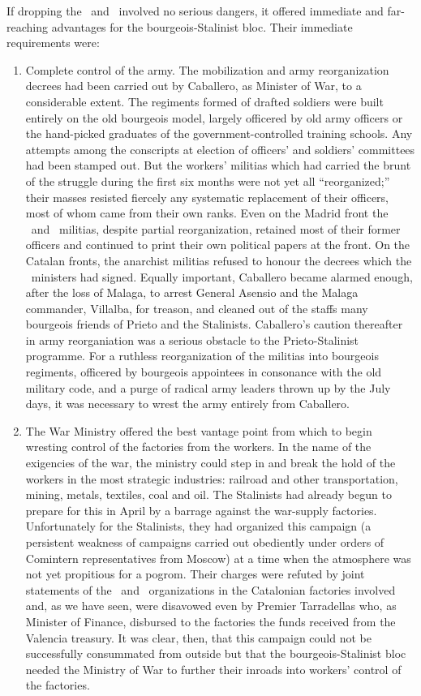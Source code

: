 If dropping the \UGT\ and \CNT\ involved no serious dangers, it offered immediate and far-reaching advantages for the bourgeois-Stalinist bloc. Their immediate requirements were:

\begin{enumerate}
  \item Complete control of the army. The mobilization and army reorganization decrees had been carried out by Caballero, as Minister of War, to a considerable extent. The regiments formed of drafted soldiers were built entirely on the old bourgeois model, largely officered by old army officers or the hand-picked graduates of the government-controlled training schools. Any attempts among the conscripts at election of officers’ and soldiers’ committees had been stamped out. But the workers’ militias which had carried the brunt of the struggle during the first six months were not yet all ``reorganized;'' their masses resisted fiercely any systematic replacement of their officers, most of whom came from their own ranks. Even on the Madrid front the \CNT\ and \UGT\ militias, despite partial reorganization, retained most of their former officers and continued to print their own political papers at the front. On the Catalan fronts, the anarchist militias refused to honour the decrees which the \CNT\ ministers had signed. Equally important, Caballero became alarmed enough, after the loss of Malaga, to arrest General Asensio and the Malaga commander, Villalba, for treason, and cleaned out of the staffs many bourgeois friends of Prieto and the Stalinists. Caballero’s caution thereafter in army reorganiation was a serious obstacle to the Prieto-Stalinist programme. For a ruthless reorganization of the militias into bourgeois regiments, officered by bourgeois appointees in consonance with the old military code, and a purge of radical army leaders thrown up by the July days, it was necessary to wrest the army entirely from Caballero.
  
  \item The War Ministry offered the best vantage point from which to begin wresting control of the factories from the workers. In the name of the exigencies of the war, the ministry could step in and break the hold of the workers in the most strategic industries: railroad and other transportation, mining, metals, textiles, coal and oil. The Stalinists had already begun to prepare for this in April by a barrage against the war-supply factories. Unfortunately for the Stalinists, they had organized this campaign (a persistent weakness of campaigns carried out obediently under orders of Comintern representatives from Moscow) at a time when the atmosphere was not yet propitious for a pogrom. Their charges were refuted by joint statements of the \CNT\ and \UGT\ organizations in the Catalonian factories involved and, as we have seen, were disavowed even by Premier Tarradellas who, as Minister of Finance, disbursed to the factories the funds received from the Valencia treasury. It was clear, then, that this campaign could not be successfully consummated from outside but that the bourgeois-Stalinist bloc needed the Ministry of War to further their inroads into workers’ control of the factories.
  

\end{enumerate}
